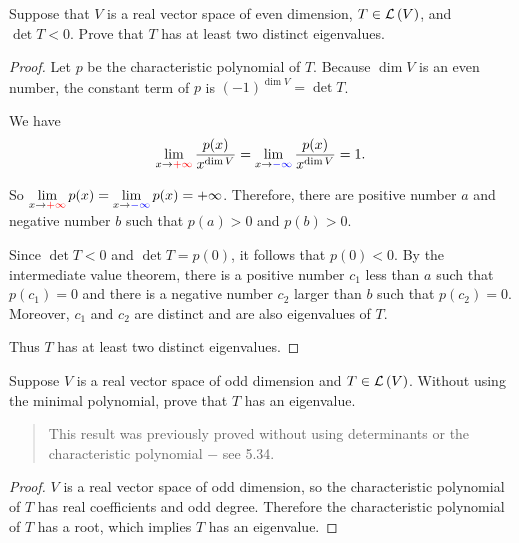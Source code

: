 \begin{exercise}\label{chapter9:sectionC:exercise9}
    Suppose that $V$ is a real vector space of even dimension, $T \in \mathcal{L}\left({V}\right)$, and $\det T < 0$. Prove that $T$ has at least two distinct eigenvalues.
\end{exercise}

\begin{proof}
    Let $p$ be the characteristic polynomial of $T$. Because $\dim V$ is an even number, the constant term of $p$ is ${(-1)}^{\dim V} = \det T$.

    We have
    \[
        \lim\limits_{x\to{\color{red}{+\infty}}}\frac{p(x)}{x^{\dim V}} = \lim\limits_{x\to{\color{blue}{-\infty}}}\frac{p(x)}{x^{\dim V}} = 1.
    \]

    So $\lim\limits_{x\to{\color{red}{+\infty}}}p(x) = \lim\limits_{x\to{\color{blue}{-\infty}}}p(x) = +\infty$. Therefore, there are positive number $a$ and negative number $b$ such that $p(a) > 0$ and $p(b) > 0$.

    Since $\det T < 0$ and $\det T = p(0)$, it follows that $p(0) < 0$. By the intermediate value theorem, there is a positive number $c_{1}$ less than $a$ such that $p(c_{1}) = 0$ and there is a negative number $c_{2}$ larger than $b$ such that $p(c_{2}) = 0$. Moreover, $c_{1}$ and $c_{2}$ are distinct and are also eigenvalues of $T$.

    Thus $T$ has at least two distinct eigenvalues.
\end{proof}
\newpage

\begin{exercise}\label{chapter9:sectionC:exercise10}
    Suppose $V$ is a real vector space of odd dimension and $T \in \mathcal{L}\left({V}\right)$. Without using the minimal polynomial, prove that $T$ has an eigenvalue.
\end{exercise}

\begin{quote}
    This result was previously proved without using determinants or the characteristic polynomial $-$ see 5.34.
\end{quote}

\begin{proof}
    $V$ is a real vector space of odd dimension, so the characteristic polynomial of $T$ has real coefficients and odd degree. Therefore the characteristic polynomial of $T$ has a root, which implies $T$ has an eigenvalue.
\end{proof}
\newpage

